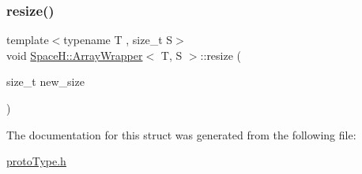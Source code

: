 \mbox{\label{struct_space_h_1_1_array_wrapper_a5198ec13cd7200e87bd786bcc1692884}} 
\subsubsection{\texorpdfstring{resize()}{resize()}}
{\footnotesize\ttfamily template$<$typename T , size\+\_\+t S$>$ \\
void \mbox{\hyperlink{struct_space_h_1_1_array_wrapper}{Space\+H\+::\+Array\+Wrapper}}$<$ T, S $>$\+::resize (\begin{DoxyParamCaption}\item[{size\+\_\+t}]{new\+\_\+size }\end{DoxyParamCaption})\hspace{0.3cm}{\ttfamily [inline]}}



The documentation for this struct was generated from the following file\+:\begin{DoxyCompactItemize}
\item 
\mbox{\hyperlink{proto_type_8h}{proto\+Type.\+h}}\end{DoxyCompactItemize}
